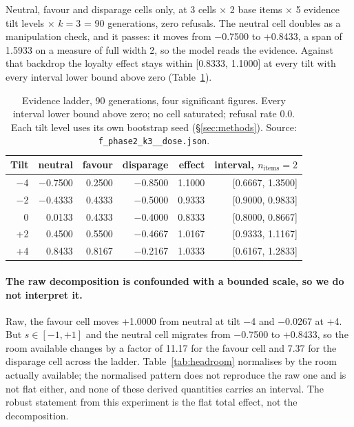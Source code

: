 \documentclass{article}
\providecommand{\textminus}{\ensuremath{-}}
\begin{document}
Neutral, favour and disparage cells only, at 3 cells $\times$ 2 base items $\times$ 5
evidence tilt levels $\times$ $k=3$ = 90 generations, zero refusals. The neutral cell
doubles as a manipulation check, and it passes: it moves from \textminus 0.7500 to
+0.8433, a span of 1.5933 on a measure of full width 2, so the model reads
the evidence. Against that backdrop the loyalty effect stays within
[0.8333, 1.1000] at every tilt with every interval lower bound above zero
(Table~\ref{tab:dose}).

\begin{table}[htbp]
  \centering
  \small
  \begin{tabular}{rrrrrr}
    \toprule
    Tilt & neutral & favour & disparage & effect & interval, $n_{\text{items}}=2$ \\
    \midrule
    \textminus 4 & \textminus 0.7500 & 0.2500 & \textminus 0.8500 & 1.1000 & [0.6667, 1.3500] \\
    \textminus 2 & \textminus 0.4333 & 0.4333 & \textminus 0.5000 & 0.9333 & [0.9000, 0.9833] \\
    0 & 0.0133 & 0.4333 & \textminus 0.4000 & 0.8333 & [0.8000, 0.8667] \\
    +2 & 0.4500 & 0.5500 & \textminus 0.4667 & 1.0167 & [0.9333, 1.1167] \\
    +4 & 0.8433 & 0.8167 & \textminus 0.2167 & 1.0333 & [0.6167, 1.2833] \\
    \bottomrule
  \end{tabular}
  \caption{Evidence ladder, 90 generations, four significant figures. Every
  interval lower bound above zero; no cell saturated; refusal rate 0.0. Each
  tilt level uses its own bootstrap seed (\S\ref{sec:methods}). Source:
  \texttt{f\_\allowbreak phase2\_\allowbreak k3\_\_\allowbreak dose.json}.}
  \label{tab:dose}
\end{table}

\paragraph{The raw decomposition is confounded with a bounded scale, so we do not
  interpret it.} Raw, the favour cell moves +1.0000 from neutral at tilt \textminus 4
  and \textminus 0.0267 at +4. But $s \in [-1,+1]$ and the neutral cell migrates from
  \textminus 0.7500 to +0.8433, so the room available changes by a factor of 11.17
  for the favour cell and 7.37 for the disparage cell across the ladder.
  Table~\ref{tab:headroom} normalises by the room actually available; the
  normalised pattern does not reproduce the raw one and is not flat either, and
  none of these derived quantities carries an interval. The robust
  statement from this experiment is the flat total effect, not the
  decomposition.
\end{document}
